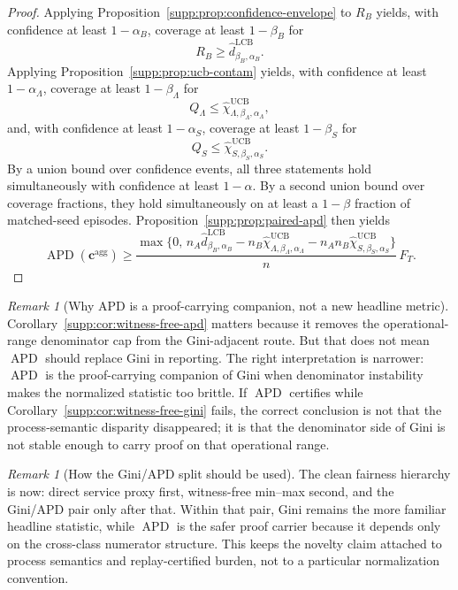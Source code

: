 \documentclass[11pt]{article}
\newcommand{\1}{\mathbf{1}}
\newcommand{\APD}{\operatorname{APD}}
\theoremstyle{definition}
\theoremstyle{plain}
\theoremstyle{remark}
\newtheorem{remark}[definition]{Remark}
\begin{document}
\begin{proof}
Applying Proposition~\ref{supp:prop:confidence-envelope} to $R_B$ yields, with confidence at least $1-\alpha_B$, coverage at least $1-\beta_B$ for
\[
R_B \ge \widehat d^{\mathrm{LCB}}_{\beta_B,\alpha_B}.
\]
Applying Proposition~\ref{supp:prop:ucb-contam} yields, with confidence at least $1-\alpha_\Lambda$, coverage at least $1-\beta_\Lambda$ for
\[
Q_\Lambda \le \widehat\chi_{\Lambda,\beta_\Lambda,\alpha_\Lambda}^{\mathrm{UCB}},
\]
and, with confidence at least $1-\alpha_S$, coverage at least $1-\beta_S$ for
\[
Q_S \le \widehat\chi_{S,\beta_S,\alpha_S}^{\mathrm{UCB}}.
\]
By a union bound over confidence events, all three statements hold simultaneously with confidence at least $1-\alpha$. By a second union bound over coverage fractions, they hold simultaneously on at least a $1-\beta$ fraction of matched-seed episodes. Proposition~\ref{supp:prop:paired-apd} then yields
\[
\APD(\mathbf c^{\mathrm{agg}})
\ge
\frac{
\max\{0,\,
 n_A \widehat d^{\mathrm{LCB}}_{\beta_B,\alpha_B}
 - n_B \widehat\chi_{\Lambda,\beta_\Lambda,\alpha_\Lambda}^{\mathrm{UCB}}
 - n_A n_B \widehat\chi_{S,\beta_S,\alpha_S}^{\mathrm{UCB}}
\}
}{n}\,F_T.
\]
\end{proof}

\begin{remark}[Why APD is a proof-carrying companion, not a new headline metric]
\label{supp:rem:apd-companion}
Corollary~\ref{supp:cor:witness-free-apd} matters because it removes the operational-range denominator cap from the Gini-adjacent route. But that does not mean $\APD$ should replace Gini in reporting. The right interpretation is narrower: $\APD$ is the proof-carrying companion of Gini when denominator instability makes the normalized statistic too brittle. If $\APD$ certifies while Corollary~\ref{supp:cor:witness-free-gini} fails, the correct conclusion is not that the process-semantic disparity disappeared; it is that the denominator side of Gini is not stable enough to carry proof on that operational range.
\end{remark}

\begin{remark}[How the Gini/APD split should be used]
\label{supp:rem:gini-apd-split}
The clean fairness hierarchy is now: direct service proxy first, witness-free min--max second, and the Gini/APD pair only after that. Within that pair, Gini remains the more familiar headline statistic, while $\APD$ is the safer proof carrier because it depends only on the cross-class numerator structure. This keeps the novelty claim attached to process semantics and replay-certified burden, not to a particular normalization convention.
\end{remark}
\end{document}
